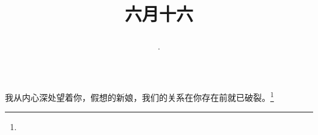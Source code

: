 \title{\date[d=21,m=7,y=2024][year:cn-y,年,month:cn,day:cn,日,·,weekday]·六月十六 }
我从内心深处望着你，假想的新娘，我们的关系在你存在前就已破裂。\footnote{ }

